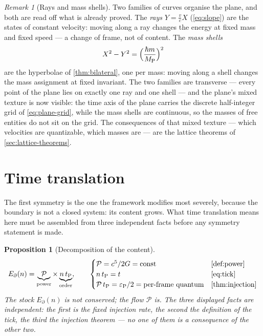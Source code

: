 \documentclass[11pt]{amsbook}
\theoremstyle{plain}
\newtheorem{proposition}[theorem]{Proposition}
\theoremstyle{definition}
\theoremstyle{remark}
\newtheorem{remark}[theorem]{Remark}
\newcommand{\uses}[1]{\par\nopagebreak\noindent{\footnotesize\emph{Uses: #1.}\par}}
\begin{document}
\begin{remark}[Rays and mass shells]\label{rem:rays-shells}
Two families of curves organise the plane, and both are read off what is already proved. The \emph{rays} $Y = \tfrac{v}{c}X$ (\cref{eq:slope}) are the states of constant velocity: moving along a ray changes the energy at fixed mass and fixed speed --- a change of frame, not of content. The \emph{mass shells}
\begin{equation}\label{eq:shells}
X^{2} - Y^{2} = \Bigl(\frac{\hbar m}{M_{\mathrm P}}\Bigr)^{2}
\end{equation}
are the hyperbolae of \cref{thm:bilateral}, one per mass: moving along a shell changes the mass assignment at fixed invariant. The two families are transverse --- every point of the plane lies on exactly one ray and one shell --- and the plane's mixed texture is now visible: the time axis of the plane carries the discrete half-integer grid of \cref{eq:plane-grid}, while the mass shells are continuous, so the masses of free entities do not sit on the grid. The consequences of that mixed texture --- which velocities are quantizable, which masses are --- are the lattice theorems of \cref{sec:lattice-theorems}.
\end{remark}

\section{Time translation}\label{sec:time-translation}

The first symmetry is the one the framework modifies most severely, because the boundary is not a closed system: its content grows. What time translation means here must be assembled from three independent facts before any symmetry statement is made.

\begin{proposition}[Decomposition of the content]\label{prop:stock}
\begin{equation}\label{eq:stock}
E_{\partial}(n) = \underbrace{\mathcal P}_{\text{power}} \times \underbrace{n\,t_{\mathrm P}}_{\text{order}},
\qquad
\begin{cases}
\mathcal P = c^{5}/2G = \text{const} & \text{\cref{def:power}}\\
n\,t_{\mathrm P} = t & \text{\cref{eq:tick}}\\
\mathcal P\,t_{\mathrm P} = \varepsilon_{\mathrm P}/2 = \text{per-frame quantum} & \text{\cref{thm:injection}}
\end{cases}
\end{equation}
The stock $E_{\partial}(n)$ is not conserved; the flow $\mathcal P$ is. The three displayed facts are independent: the first is the fixed injection rate, the second the definition of the tick, the third the injection theorem --- no one of them is a consequence of the other two.
\uses{\cref{def:power}, \cref{eq:tick}, \cref{thm:injection}}
\end{proposition}
\end{document}
